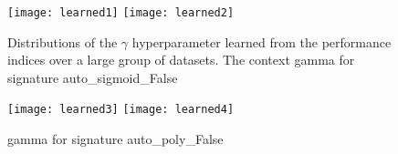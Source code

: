 \begin{figure}
	\centering
	\texttt{[image: learned1]}
	\texttt{[image: learned2]}
	\caption[Uninformative learned general priors]{Distributions of the $\gamma$ hyperparameter learned from the performance indices over
	a large group of datasets. The context gamma for signature auto\_sigmoid\_False} \label{img:learned1}
	\label{fig:learned_gamma1}
\end{figure}


\begin{figure}
	\centering
	\texttt{[image: learned3]}
	\texttt{[image: learned4]}
	\caption[Informative learned general priors]{gamma for signature auto\_poly\_False}
	\label{fig:learned_gamma2}
\end{figure}

